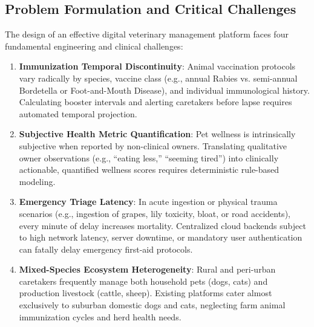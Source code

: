 \documentclass[conference]{IEEEtran}
\begin{document}
\subsection{Problem Formulation and Critical Challenges}
The design of an effective digital veterinary management platform faces four fundamental engineering and clinical challenges:
\begin{enumerate}
    \item \textbf{Immunization Temporal Discontinuity}: Animal vaccination protocols vary radically by species, vaccine class (e.g., annual Rabies vs. semi-annual Bordetella or Foot-and-Mouth Disease), and individual immunological history. Calculating booster intervals and alerting caretakers before lapse requires automated temporal projection.
    \item \textbf{Subjective Health Metric Quantification}: Pet wellness is intrinsically subjective when reported by non-clinical owners. Translating qualitative owner observations (e.g., ``eating less,'' ``seeming tired'') into clinically actionable, quantified wellness scores requires deterministic rule-based modeling.
    \item \textbf{Emergency Triage Latency}: In acute ingestion or physical trauma scenarios (e.g., ingestion of grapes, lily toxicity, bloat, or road accidents), every minute of delay increases mortality. Centralized cloud backends subject to high network latency, server downtime, or mandatory user authentication can fatally delay emergency first-aid protocols.
    \item \textbf{Mixed-Species Ecosystem Heterogeneity}: Rural and peri-urban caretakers frequently manage both household pets (dogs, cats) and production livestock (cattle, sheep). Existing platforms cater almost exclusively to suburban domestic dogs and cats, neglecting farm animal immunization cycles and herd health needs.
\end{enumerate}
\end{document}
